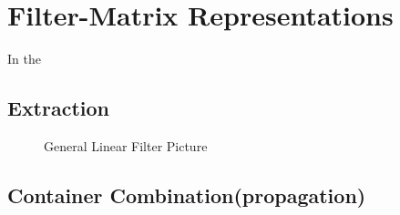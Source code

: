 \section{Filter-Matrix Representations}
In the 


\subsection{Extraction}
\begin{figure}
\center
\epsfxsize=4.5in
\caption{General Linear Filter Picture}
\label{fig:overview}
\end{figure}


\subsection{Container Combination(propagation)}

